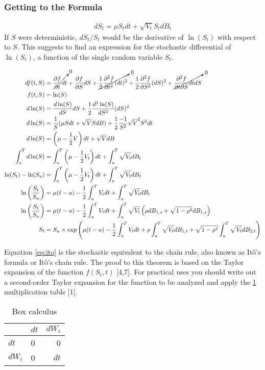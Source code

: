\documentclass[12pt,twoside]{reedthesis}
\theoremstyle{definition}
\theoremstyle{definition}
\theoremstyle{remark}
\begin{document}
  \subsubsection{Getting to the Formula}\label{getting-to-the-formula}
  \begin{align}
  dS_t = \mu S_t dt + \sqrt{V_t} S_t dB_t
  \end{align}
  If \(S\) were deterministic, \(dS_t/S_t\) would be the derivative of
  \(\ln(S_t)\) with respect to \(S\). This suggests to find an expression
  for the stochastic differential of \(\ln(S_t)\), a function of the
  single random variable \(S_t\).
  \begin{scriptsize}
  \begin{align}
  df(t,S) &= \cancelto{0}{\frac{\partial f}{\partial t}dt}  + \frac{\partial f}{\partial S} dS + \cancelto{0}{\frac{1}{2} \frac{\partial^2 f}{\partial t^2} (dt)^2} + \frac{1}{2} \frac{\partial^2 f}{\partial S^2} (dS)^2  + \cancelto{0}{\frac{\partial^2 f}{\partial t \partial S} dt dS} \\
  f(t,S) &= \ln(S) \\
  d\ln(S) &= \frac{d\ln(S)}{dS} dS + \frac{1}{2} \frac{d^2\ln(S)}{dS^2}(dS)^2 \\
  d\ln(S) &= \frac{1}{S} (\mu S dt + \sqrt{V} S dB) + \frac{1}{2}\frac{-1}{S^2}\sqrt{V}^2 S^2 dt \\
  d\ln(S) &= \left( \mu -  \frac{1}{2} V \right) dt + \sqrt{V} dB \\
  \int_{u}^{T}{d\ln(S)} &= \int_{u}^{T}{\left( \mu - \frac{1}{2} V_t \right) dt} + \int_{u}^{T}{\sqrt{V_t}dB_t} \\
  \ln(S_t) - \ln(S_u) &= \int_{u}^{T}{\left( \mu - \frac{1}{2} V_t \right) dt} + \int_{u}^{T}{\sqrt{V_t}dB_t} \\
  \ln \left( \frac{S_t}{S_u} \right) &= \mu (t-u) - \frac{1}{2}\int_{u}^{T}{V_t dt} + \int_{u}^{T}{\sqrt{V_t} dB_t} \\
  \ln \left( \frac{S_t}{S_u} \right) &= \mu (t-u) - \frac{1}{2}\int_{u}^{T}{V_t dt} + \int_{u}^{T}{\sqrt{V_t} \left(\rho dB_{1,s} + \sqrt{1-\rho^2} dB_{1,s} \right)} \\
  S_t &= S_u \times \exp \left( \mu (t-u) - \frac{1}{2} \int_{u}^{T}{V_t dt} + \rho \int_{u}^{T}{\sqrt{V_t}dB_{1,t}}+ \sqrt{1 - \rho^2} \int_{u}^{T}{\sqrt{V_t}dB_{2,t}} \right)
  \end{align}
  \end{scriptsize}
  Equation \eqref{eq:ito} is the stochastic equivalent to the chain rule,
  also known as Itô's formula or Itô's chain rule. The proof to this
  theorem is based on the Taylor expansion of the function \(f(S_t, t)\)
  {[}4,7{]}. For practical uses you should write out a second-order Taylor
  expansion for the function to be analyzed and apply the
  \ref{tab:box-calc} multiplication table {[}1{]}.
  \begin{longtable}[t]{llr}
  \caption{\label{tab:box-calc}Box calculus}\\
  \toprule
    & $dt$ & $dW_t$\\
  \midrule
  $dt$ & 0 & 0\\
  $dW_t$ & 0 & $dt$\\
  \bottomrule
  \end{longtable}
\end{document}
